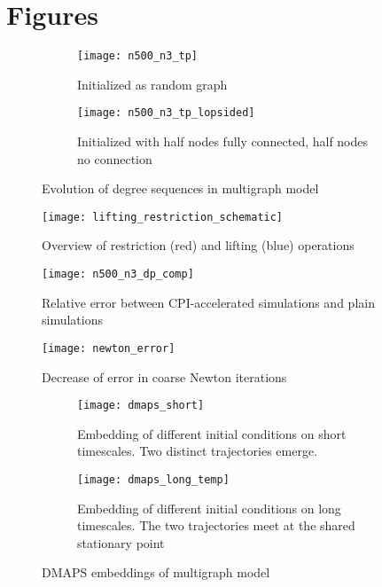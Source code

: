 \section*{Figures}

\begin{centering}

\begin{figure}[h!]
  \centering
  \begin{subfigure}{0.5\linewidth}
    \texttt{[image: n500\_n3\_tp]}
    \caption{Initialized as  random graph}
    \label{mm:evo1}
  \end{subfigure}%
  \begin{subfigure}{0.5\linewidth}
    \texttt{[image: n500\_n3\_tp\_lopsided]}
    \caption{Initialized with half nodes fully connected, half nodes no connection}
    \label{mm:evo2}
  \end{subfigure}%
  \caption{Evolution of degree sequences in multigraph model}
  \label{mm:evo}
\end{figure}

\newpage
\begin{landscape}

\begin{figure}[h!]
  \centering
  \texttt{[image: lifting\_restriction\_schematic]}
  \caption{Overview of restriction (red) and lifting (blue) operations}
  \label{mm:schematic}
\end{figure}

\end{landscape}

\begin{figure}[h!]
  \centering
  \texttt{[image: n500\_n3\_dp\_comp]}
  \caption{Relative error between CPI-accelerated simulations and plain simulations}
  \label{mm:cpi}
\end{figure}

\begin{figure}[h!]
  \centering
  \texttt{[image: newton\_error]}
  \caption{Decrease of error in coarse Newton iterations}
  \label{mm:newton}
\end{figure}

\begin{figure}[h!]
  \centering
  \begin{subfigure}{0.5\linewidth}
    \captionsetup{width=0.8\linewidth}
    \texttt{[image: dmaps\_short]}
    \caption{Embedding of different initial conditions on short timescales. Two distinct trajectories emerge.}
    \label{mm:dmaps1}
  \end{subfigure}%
  \begin{subfigure}{0.5\linewidth}
    \captionsetup{width=0.8\linewidth}
    \texttt{[image: dmaps\_long\_temp]}
    \caption{Embedding of different initial conditions on long timescales. The two trajectories meet at the shared stationary point}
    \label{mm:dmaps2}
  \end{subfigure}%
  \caption{DMAPS embeddings of multigraph model}
  \label{mm:evo}
\end{figure}


\end{centering}